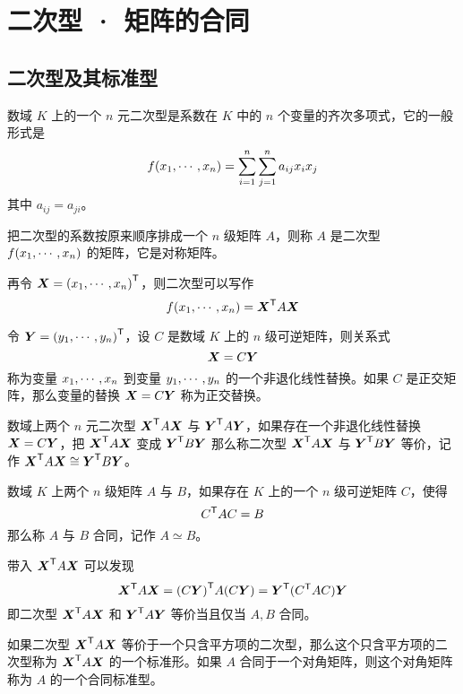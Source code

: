 \chapter{二次型 · 矩阵的合同}

\newcommand{\XAX}{\transpose{\vbf{X}}A\vbf{X}}

\section{二次型及其标准型}

\begin{definition}[二次型]
	数域 $K$ 上的一个 $n$ 元二次型是系数在 $K$ 中的 $n$ 个变量的齐次多项式，它的一般形式是
	\[f(x_1,\cdots,x_n) = \sum_{i=1}^n\sum_{j=1}^na_{ij}x_ix_j\]
	其中 $a_{ij} = a_{ji}$。
\end{definition}

把二次型的系数按原来顺序排成一个 $n$ 级矩阵 $A$，则称 $A$ 是二次型 $f(x_1,\cdots,x_n)$ 的矩阵，它是对称矩阵。

再令 $\boldsymbol{X} = {(x_1,\cdots,x_n)}^\mathsf{T}$，则二次型可以写作
\[f(\seq{x}{n}) = \XAX\]

令 $\boldsymbol{Y} = {(y_1,\cdots,y_n)}^\mathsf{T}$，设 $C$ 是数域 $K$ 上的 $n$ 级可逆矩阵，则关系式
\[\boldsymbol{X} = C\boldsymbol{Y}\]
称为变量 $x_1,\cdots,x_n$ 到变量 $y_1,\cdots,y_n$ 的一个非退化线性替换。如果 $C$ 是正交矩阵，那么变量的替换 $\boldsymbol{X} = C\boldsymbol{Y}$ 称为正交替换。

\begin{definition}
	数域上两个 $n$ 元二次型 $\XAX$ 与 ${\boldsymbol{Y}}^\mathsf{T}A\boldsymbol{Y}$，如果存在一个非退化线性替换 $\boldsymbol{X} = C\boldsymbol{Y}$，把 $\XAX$ 变成 ${\boldsymbol{Y}}^\mathsf{T}B\boldsymbol{Y}$ 那么称二次型 $\XAX$ 与 ${\boldsymbol{Y}}^\mathsf{T}B\boldsymbol{Y}$ 等价，记作 $\XAX \cong \transpose{\vbf{Y}}B\vbf{Y}$。
\end{definition}

\begin{definition}
	数域 $K$ 上两个 $n$ 级矩阵 $A$ 与 $B$，如果存在 $K$ 上的一个 $n$ 级可逆矩阵 $C$，使得
	\[{C}^\mathsf{T}AC = B\]
	那么称 $A$ 与 $B$ 合同，记作 $A\simeq B$。
\end{definition}

带入 $\XAX$ 可以发现
\[ \XAX = \transpose{(C\vbf{Y})} A (C\vbf{Y}) = \transpose{\vbf{Y}} (\transpose{C} A C) \vbf{Y} \]
即二次型 $\XAX$ 和 ${\boldsymbol{Y}}^\mathsf{T}A\boldsymbol{Y}$ 等价当且仅当 $A, B$ 合同。

如果二次型 ${\boldsymbol{X}}^\mathsf{T} A \boldsymbol{X}$ 等价于一个只含平方项的二次型，那么这个只含平方项的二次型称为 $\XAX$ 的一个标准形。如果 $A$ 合同于一个对角矩阵，则这个对角矩阵称为 $A$ 的一个合同标准型。

